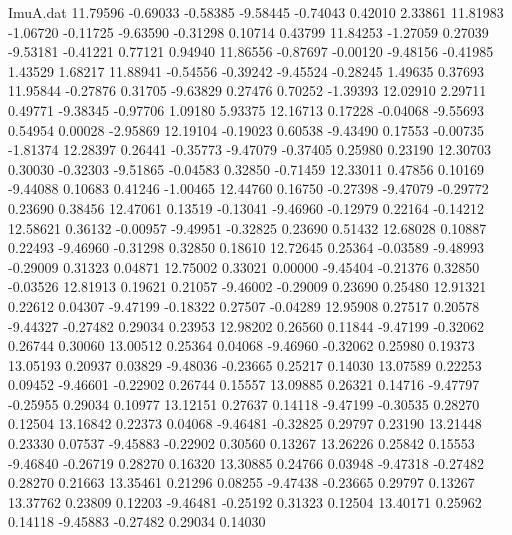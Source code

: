 \begin{filecontents}{ImuA.dat}
  11.79596   -0.69033   -0.58385   -9.58445   -0.74043    0.42010    2.33861
  11.81983   -1.06720   -0.11725   -9.63590   -0.31298    0.10714    0.43799
  11.84253   -1.27059    0.27039   -9.53181   -0.41221    0.77121    0.94940
  11.86556   -0.87697   -0.00120   -9.48156   -0.41985    1.43529    1.68217
  11.88941   -0.54556   -0.39242   -9.45524   -0.28245    1.49635    0.37693
  11.95844   -0.27876    0.31705   -9.63829    0.27476    0.70252   -1.39393
  12.02910    2.29711    0.49771   -9.38345   -0.97706    1.09180    5.93375
  12.16713    0.17228   -0.04068   -9.55693    0.54954    0.00028   -2.95869
  12.19104   -0.19023    0.60538   -9.43490    0.17553   -0.00735   -1.81374
  12.28397    0.26441   -0.35773   -9.47079   -0.37405    0.25980    0.23190
  12.30703    0.30030   -0.32303   -9.51865   -0.04583    0.32850   -0.71459
  12.33011    0.47856    0.10169   -9.44088    0.10683    0.41246   -1.00465
  12.44760    0.16750   -0.27398   -9.47079   -0.29772    0.23690    0.38456
  12.47061    0.13519   -0.13041   -9.46960   -0.12979    0.22164   -0.14212
  12.58621    0.36132   -0.00957   -9.49951   -0.32825    0.23690    0.51432
  12.68028    0.10887    0.22493   -9.46960   -0.31298    0.32850    0.18610
  12.72645    0.25364   -0.03589   -9.48993   -0.29009    0.31323    0.04871
  12.75002    0.33021    0.00000   -9.45404   -0.21376    0.32850   -0.03526
  12.81913    0.19621    0.21057   -9.46002   -0.29009    0.23690    0.25480
  12.91321    0.22612    0.04307   -9.47199   -0.18322    0.27507   -0.04289
  12.95908    0.27517    0.20578   -9.44327   -0.27482    0.29034    0.23953
  12.98202    0.26560    0.11844   -9.47199   -0.32062    0.26744    0.30060
  13.00512    0.25364    0.04068   -9.46960   -0.32062    0.25980    0.19373
  13.05193    0.20937    0.03829   -9.48036   -0.23665    0.25217    0.14030
  13.07589    0.22253    0.09452   -9.46601   -0.22902    0.26744    0.15557
  13.09885    0.26321    0.14716   -9.47797   -0.25955    0.29034    0.10977
  13.12151    0.27637    0.14118   -9.47199   -0.30535    0.28270    0.12504
  13.16842    0.22373    0.04068   -9.46481   -0.32825    0.29797    0.23190
  13.21448    0.23330    0.07537   -9.45883   -0.22902    0.30560    0.13267
  13.26226    0.25842    0.15553   -9.46840   -0.26719    0.28270    0.16320
  13.30885    0.24766    0.03948   -9.47318   -0.27482    0.28270    0.21663
  13.35461    0.21296    0.08255   -9.47438   -0.23665    0.29797    0.13267
  13.37762    0.23809    0.12203   -9.46481   -0.25192    0.31323    0.12504
  13.40171    0.25962    0.14118   -9.45883   -0.27482    0.29034    0.14030

\end{filecontents}
